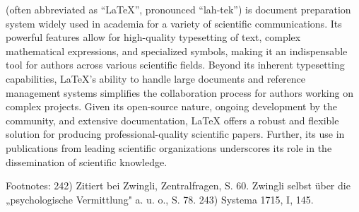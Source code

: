  (often abbreviated as “LaTeX”, pronounced “lah-tek”) is document preparation system widely used in academia for a variety of scientific communications. Its powerful features allow for high-quality typesetting of text, complex mathematical expressions, and specialized symbols, making it an indispensable tool for authors across various scientific fields. Beyond its inherent typesetting capabilities, LaTeX’s ability to handle large documents and reference management systems simplifies the collaboration process for authors working on complex projects. Given its open-source nature, ongoing development by the community, and extensive documentation, LaTeX offers a robust and flexible solution for producing professional-quality scientific papers. Further, its use in publications from leading scientific organizations underscores its role in the dissemination of scientific knowledge.

Footnotes:
242) Zitiert bei Zwingli, Zentralfragen, S. 60. Zwingli selbst über die „psychologische Vermittlung" a. u. o., S. 78.
243) Systema 1715, I, 145.